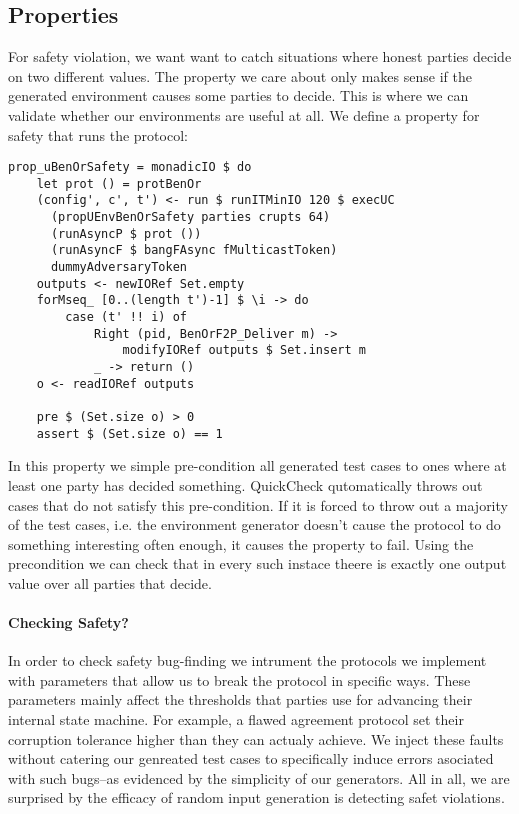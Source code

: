 \subsection{Properties}
For safety violation, we want want to catch situations where honest parties decide on two different values. 
The property we care about only makes sense if the generated environment causes some parties to decide.
This is where we can validate whether our environments are useful at all.
We define a property for safety that runs the protocol:
\begin{lstlisting}
prop_uBenOrSafety = monadicIO $ do
    let prot () = protBenOr
    (config', c', t') <- run $ runITMinIO 120 $ execUC 
      (propUEnvBenOrSafety parties crupts 64)
      (runAsyncP $ prot ()) 
      (runAsyncF $ bangFAsync fMulticastToken) 
      dummyAdversaryToken
    outputs <- newIORef Set.empty
    forMseq_ [0..(length t')-1] $ \i -> do
        case (t' !! i) of 
            Right (pid, BenOrF2P_Deliver m) -> 
                modifyIORef outputs $ Set.insert m
            _ -> return ()
    o <- readIORef outputs

    pre $ (Set.size o) > 0
    assert $ (Set.size o) == 1
\end{lstlisting}
In this property we simple pre-condition all generated test cases to ones where at least one party has decided something. 
QuickCheck qutomatically throws out cases that do not satisfy this pre-condition.
If it is forced to throw out a majority of the test cases, i.e. the environment generator doesn't cause the protocol to do something interesting often enough, it causes the property to fail.
Using the precondition we can check that in every such instace theere is exactly one output value over all parties that decide.

\paragraph{Checking Safety?}
In order to check safety bug-finding we intrument the protocols we implement with parameters that allow us to break the protocol in specific ways.
These parameters mainly affect the thresholds that parties use for advancing their internal state machine.
For example, a flawed agreement protocol set their corruption tolerance higher than they can actualy achieve. 
We inject these faults without catering our genreated test cases to specifically induce errors asociated with such bugs--as evidenced by the simplicity of our generators.
All in all, we are surprised by the efficacy of random input generation is detecting safet violations. 

